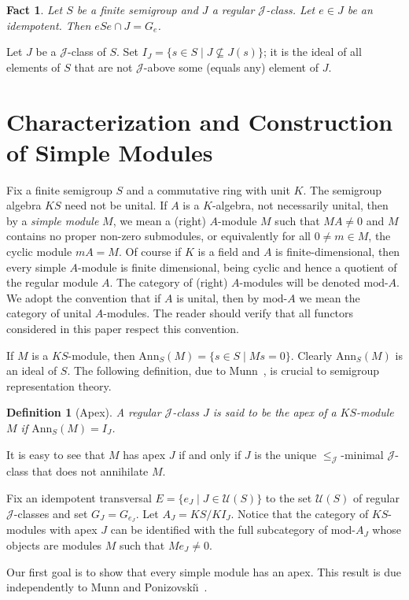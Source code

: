 \documentclass[reqno,11pt]{amsart}
\def\module#1{\mathrm{mod}\text{-}#1}
\def\Ann#1{\mathrm{Ann}_S(#1)}
\def\J{\mathrel{{\mathscr J}}} %
\def\Definitionname{Definition}
\newtheorem{Fact}[Thm]{Fact}
\newtheorem{Def}[Thm]{\Definitionname}
\numberwithin{equation}{section}
\begin{document}
\begin{Fact}\label{dropoutofJ}
Let $S$ be a finite semigroup and $J$ a regular $\J$-class. Let $e\in
J$ be an idempotent.  Then $eSe\cap J=G_e$.
\end{Fact}

Let $J$ be a $\J$-class of $S$.  Set $I_J = \{s\in S\mid J\nsubseteq
J(s)\}$; it is the ideal of all elements of $S$
that are not $\J$-above some (equals any) element of $J$.

\section{Characterization and Construction of Simple Modules}
Fix a finite semigroup $S$ and a commutative ring with unit $K$.  The
semigroup algebra
$KS$ need not be unital. If $A$ is a $K$-algebra,
not necessarily unital, then by a \emph{simple module} $M$, we mean a
(right) $A$-module $M$ such that $MA\neq 0$ and $M$
contains no proper non-zero submodules, or equivalently for all $0\neq
m\in M$, the cyclic module $mA=M$.   Of
course if $K$ is a field and $A$ is finite-dimensional, then every simple $A$-module is finite 
dimensional, being cyclic and hence a quotient of the regular module
$A$.  The category of (right) $A$-modules will be denoted $\module A$.
We adopt the convention that if $A$ is unital, then by $\module A$ we
mean the category of unital $A$-modules.  The reader should verify
that all functors considered in this paper respect this convention.  

If $M$ is a $KS$-module, then $\Ann M=\{s\in S\mid Ms=0\}$.
Clearly $\Ann M$ is an ideal of $S$.
The following definition, due to Munn~\cite{Munn1}, is crucial to semigroup representation
theory.

\begin{Def}[Apex]
A regular $\J$-class $J$ is said to be the apex of a $KS$-module $M$
if $\Ann M=I_J$.
\end{Def}
It is easy to see that $M$ has apex $J$ if and only if $J$ is the
unique $\leq_{\J}$-minimal $\J$-class that does not annihilate $M$.

Fix an idempotent transversal $E=\{e_J\mid J\in \mathscr U(S)\}$ to
the set $\mathscr U(S)$ of regular $\J$-classes  and set $G_J=
G_{e_J}$.  Let $A_J=KS/KI_J$.  Notice that the category of
$KS$-modules with apex $J$ can be identified with the full subcategory
of $\module {A_J}$ whose objects are modules $M$ such that
$Me_J\neq 0$.

Our first goal is to show that every simple module has an apex.  This
result is due independently to Munn and
Ponizovski{\u\i}~\cite{Munn1,Munn2,Poni}.
\end{document}
